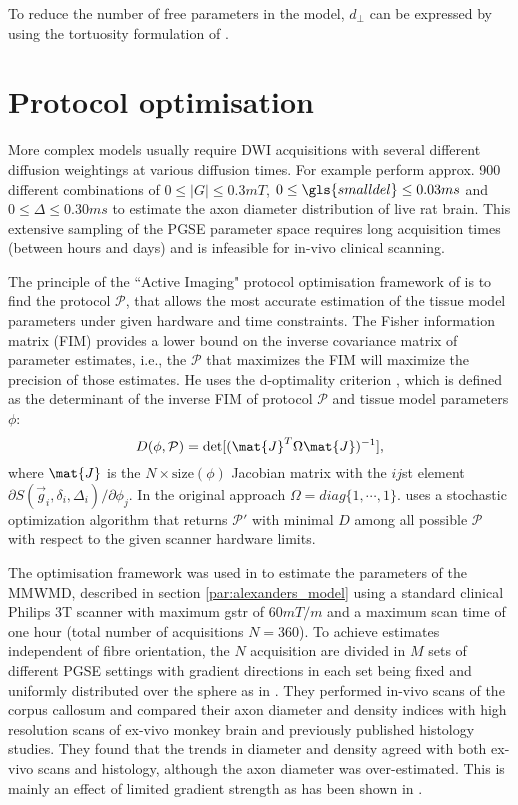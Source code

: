 To reduce the number of free parameters in the model, $d_\perp$ can be expressed by using the tortuosity formulation of \citet{Szafer:1995}.

\section{Protocol optimisation}
\label{sec:protocol_optimisation}
More complex models usually require  {\gls{DWI}}  acquisitions with several different diffusion weightings at various diffusion times. For example \citet{Barazany:2009} perform approx. 900 different combinations of $0\le|G|\le 0.3mT$, $0\le {\gls{smalldel}} \le 0.03ms$ and $0\le \Delta \le 0.30ms$ to estimate the axon diameter distribution of live rat brain. This extensive sampling of the \gls{PGSE} parameter space requires long acquisition times (between hours and days) and is infeasible for in-vivo clinical scanning. 

The principle of the ``Active Imaging" protocol optimisation framework of \cite{Alexander:2008} is to find the protocol $\mathcal{P}$, that allows the most accurate estimation of the tissue model parameters under given hardware and time constraints. The Fisher information matrix (FIM) provides a lower bound on the inverse covariance matrix of parameter estimates, i.e., the $\mathcal{P}$ that maximizes the FIM will maximize the precision of those estimates. He uses the d-optimality criterion \citep{OBrien:2003}, which is defined as the determinant of the inverse FIM of protocol $\mathcal{P}$ and tissue model parameters $\phi$:
\begin{equation}
	D(\phi,\mathcal{P})=\det[(\mat{J}^T\Omega\mat{J})^{-1}], 
	\label{eq-optimality}
\end{equation}
where $\mat{J}$ is the $N\times \mbox{size}(\phi)$ Jacobian matrix with the $ij$st element $\partial S(\vec{g}_i,\delta_i,\Delta_i) / \partial \phi_j$. In the original approach $\Omega=diag\{1,\cdots,1\}$. \citet{Alexander:2008} uses a stochastic optimization algorithm \citep{Zelinka:2010} that returns $\mathcal{P}'$ with minimal $D$ among all possible $\mathcal{P}$ with respect to the given scanner hardware limits.

The optimisation framework was used in \citet{Alexander:2010} to estimate the parameters of the \gls{MMWMD}, described in section \ref{par:alexanders_model} using a standard clinical Philips 3T scanner with maximum {\gls{gstr}} of $60mT/m$ and a maximum scan time of one hour (total number of acquisitions $N=360$). To achieve estimates independent of fibre orientation, the $N$ acquisition are divided in $M$ sets of different PGSE settings with gradient directions in each set being fixed and uniformly distributed over the sphere as in \cite{Jones:2004a}. They performed in-vivo scans of the corpus callosum and compared their axon diameter and density indices with high resolution scans of ex-vivo monkey brain and previously published histology studies. They found that the trends in diameter and density agreed with both ex-vivo scans and histology, although the axon diameter was over-estimated. This is mainly an effect of limited gradient strength as has been shown in \cite{Dyrby:2010}.  

